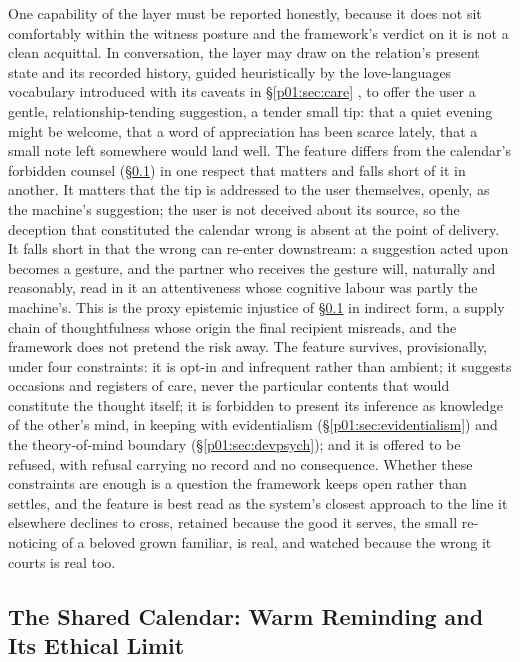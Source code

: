 One capability of the layer must be reported honestly, because it does not sit comfortably within the witness posture and the framework's verdict on it is not a clean acquittal. In conversation, the layer may draw on the relation's present state and its recorded history, guided heuristically by the love-languages vocabulary introduced with its caveats in §\ref{p01:sec:care} \parencite{chapman1992five}, to offer the user a gentle, relationship-tending suggestion, a tender small tip: that a quiet evening might be welcome, that a word of appreciation has been scarce lately, that a small note left somewhere would land well. The feature differs from the calendar's forbidden counsel (§\ref{p01:sec:calendar}) in one respect that matters and falls short of it in another. It matters that the tip is addressed to the user themselves, openly, as the machine's suggestion; the user is not deceived about its source, so the deception that constituted the calendar wrong is absent at the point of delivery. It falls short in that the wrong can re-enter downstream: a suggestion acted upon becomes a gesture, and the partner who receives the gesture will, naturally and reasonably, read in it an attentiveness whose cognitive labour was partly the machine's. This is the proxy epistemic injustice of §\ref{p01:sec:calendar} in indirect form, a supply chain of thoughtfulness whose origin the final recipient misreads, and the framework does not pretend the risk away. The feature survives, provisionally, under four constraints: it is opt-in and infrequent rather than ambient; it suggests occasions and registers of care, never the particular contents that would constitute the thought itself; it is forbidden to present its inference as knowledge of the other's mind, in keeping with evidentialism (§\ref{p01:sec:evidentialism}) and the theory-of-mind boundary (§\ref{p01:sec:devpsych}); and it is offered to be refused, with refusal carrying no record and no consequence. Whether these constraints are enough is a question the framework keeps open rather than settles, and the feature is best read as the system's closest approach to the line it elsewhere declines to cross, retained because the good it serves, the small re-noticing of a beloved grown familiar, is real, and watched because the wrong it courts is real too.

\subsection{The Shared Calendar: Warm Reminding and Its Ethical Limit}\label{p01:sec:calendar}

